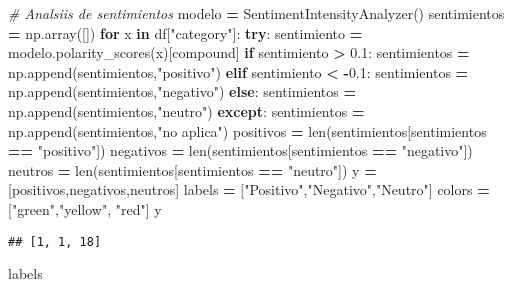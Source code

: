 \documentclass[
]{article}
\newenvironment{Shaded}{\begin{snugshade}}{\end{snugshade}}
\newcommand{\BuiltInTok}[1]{#1}
\newcommand{\CommentTok}[1]{\textcolor[rgb]{0.56,0.35,0.01}{\textit{#1}}}
\newcommand{\ControlFlowTok}[1]{\textcolor[rgb]{0.13,0.29,0.53}{\textbf{#1}}}
\newcommand{\FloatTok}[1]{\textcolor[rgb]{0.00,0.00,0.81}{#1}}
\newcommand{\KeywordTok}[1]{\textcolor[rgb]{0.13,0.29,0.53}{\textbf{#1}}}
\newcommand{\NormalTok}[1]{#1}
\newcommand{\OperatorTok}[1]{\textcolor[rgb]{0.81,0.36,0.00}{\textbf{#1}}}
\newcommand{\StringTok}[1]{\textcolor[rgb]{0.31,0.60,0.02}{#1}}
\begin{document}
\begin{Shaded}
\begin{Highlighting}[]
\CommentTok{\# Analsiis de sentimientos}
\NormalTok{modelo }\OperatorTok{=}\NormalTok{ SentimentIntensityAnalyzer()}
\NormalTok{sentimientos }\OperatorTok{=}\NormalTok{ np.array([])}
\ControlFlowTok{for}\NormalTok{ x }\KeywordTok{in}\NormalTok{ df[}\StringTok{"category"}\NormalTok{]:}
  \ControlFlowTok{try}\NormalTok{:}
\NormalTok{    sentimiento }\OperatorTok{=}\NormalTok{ modelo.polarity\_scores(x)[}\StringTok{\textquotesingle{}compound\textquotesingle{}}\NormalTok{]}
    \ControlFlowTok{if}\NormalTok{ sentimiento }\OperatorTok{\textgreater{}} \FloatTok{0.1}\NormalTok{:}
\NormalTok{      sentimientos }\OperatorTok{=}\NormalTok{ np.append(sentimientos,}\StringTok{"positivo"}\NormalTok{)}
    \ControlFlowTok{elif}\NormalTok{ sentimiento }\OperatorTok{\textless{}} \OperatorTok{{-}}\FloatTok{0.1}\NormalTok{:}
\NormalTok{      sentimientos }\OperatorTok{=}\NormalTok{ np.append(sentimientos,}\StringTok{"negativo"}\NormalTok{)}
    \ControlFlowTok{else}\NormalTok{:}
\NormalTok{      sentimientos }\OperatorTok{=}\NormalTok{ np.append(sentimientos,}\StringTok{"neutro"}\NormalTok{)}
  \ControlFlowTok{except}\NormalTok{:}
\NormalTok{    sentimientos }\OperatorTok{=}\NormalTok{ np.append(sentimientos,}\StringTok{"no aplica"}\NormalTok{)}
\NormalTok{positivos }\OperatorTok{=} \BuiltInTok{len}\NormalTok{(sentimientos[sentimientos }\OperatorTok{==} \StringTok{"positivo"}\NormalTok{])}
\NormalTok{negativos }\OperatorTok{=} \BuiltInTok{len}\NormalTok{(sentimientos[sentimientos }\OperatorTok{==} \StringTok{"negativo"}\NormalTok{])}
\NormalTok{neutros }\OperatorTok{=} \BuiltInTok{len}\NormalTok{(sentimientos[sentimientos }\OperatorTok{==} \StringTok{"neutro"}\NormalTok{])}
\NormalTok{y }\OperatorTok{=}\NormalTok{ [positivos,negativos,neutros]}
\NormalTok{labels }\OperatorTok{=}\NormalTok{ [}\StringTok{"Positivo"}\NormalTok{,}\StringTok{"Negativo"}\NormalTok{,}\StringTok{"Neutro"}\NormalTok{]}
\NormalTok{colors }\OperatorTok{=}\NormalTok{ [}\StringTok{"green"}\NormalTok{,}\StringTok{"yellow"}\NormalTok{, }\StringTok{"red"}\NormalTok{]}
\NormalTok{y}
\end{Highlighting}
\end{Shaded}

\begin{verbatim}
## [1, 1, 18]
\end{verbatim}

\begin{Shaded}
\begin{Highlighting}[]
\NormalTok{labels}
\end{Highlighting}
\end{Shaded}
\end{document}
